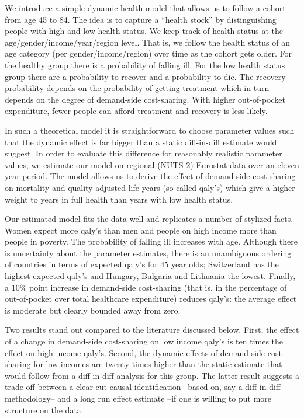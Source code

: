 \documentclass[a4paper,12pt]{article}
\begin{document}
We introduce a simple dynamic health model that allows us to follow a cohort from age 45 to 84. The idea is to capture a ``health stock'' by distinguishing people with high and low health status. We keep track of health status at the age/gender/income/year/region level. That is, we follow the health status of an age category (per gender/income/region) over time as the cohort gets older. For the healthy group there is a probability of falling ill. For the low health status group there are a probability to recover and a probability to die. The recovery probability depends on the probability of getting treatment which in turn depends on the degree of demand-side cost-sharing. With higher out-of-pocket expenditure, fewer people can afford treatment and recovery is less likely.

In such a theoretical model it is straightforward to choose parameter values such that the dynamic effect is far bigger than a static diff-in-diff estimate would suggest. In order to evaluate this difference for reasonably realistic parameter values, we estimate our model on regional (NUTS 2) Eurostat data over an eleven year period. The model allows us to derive the effect of demand-side cost-sharing on mortality and quality adjusted life years (so called qaly's) which give a higher weight to years in full health than years with low health status.

Our estimated model fits the data well and replicates a number of stylized facts. Women expect more qaly's than men and people on high income more than people in poverty. The probability of falling ill increases with age. Although there is uncertainty about the parameter estimates, there is an unambiguous ordering of countries in terms of expected qaly's for 45 year olds; Switzerland has the highest expected qaly's and Hungary, Bulgaria and Lithuania the lowest. Finally, a 10\% point increase in demand-side cost-sharing (that is, in the percentage of out-of-pocket over total healthcare expenditure) reduces qaly's: the average effect is moderate but clearly bounded away from zero.

Two results stand out compared to the literature discussed below. First, the effect of a change in demand-side cost-sharing on low income qaly's is ten times the effect on high income qaly's. Second, the dynamic effects of demand-side cost-sharing for low incomes are twenty times higher than the static estimate that would follow from a diff-in-diff analysis for this group. The latter result suggests a trade off between a clear-cut causal identification --based on, say a diff-in-diff methodology-- and a long run effect estimate --if one is willing to put more structure on the data.
\end{document}

